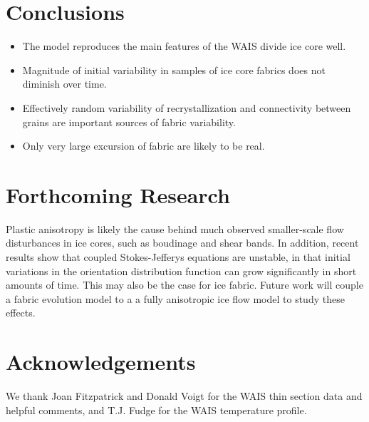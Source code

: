 \documentclass[a0,landscape]{a0poster}
\begin{document}
\begin{multicols}{3}
\section*{Conclusions}

\begin{itemize}
\item The model reproduces the main features of the WAIS divide ice core well.
\item Magnitude of initial variability in samples of ice core fabrics does not diminish over time.
\item Effectively random variability of recrystallization and connectivity between grains are important sources of fabric variability. 
\item Only very large excursion of fabric are likely to be real.
\end{itemize}

\color{DarkSlateGray} %


\section*{Forthcoming Research}
Plastic anisotropy is likely the cause behind much observed smaller-scale flow disturbances in ice cores, such as boudinage and shear bands. In addition, recent results show that coupled Stokes-Jefferys equations are unstable, in that initial variations in the orientation distribution function can grow significantly in short amounts of time. This may also be the case for ice fabric. Future work will couple a fabric evolution model to a a fully anisotropic ice flow model to study these effects.

\nocite{*} %


\section*{Acknowledgements}

We thank Joan Fitzpatrick and Donald Voigt for the WAIS thin section data and helpful comments, and T.J. Fudge for the WAIS temperature profile.


\end{multicols}
\end{document}
